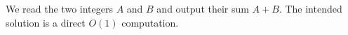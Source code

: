 We read the two integers $A$ and $B$ and output their sum $A + B$. The intended
solution is a direct $O(1)$ computation.
